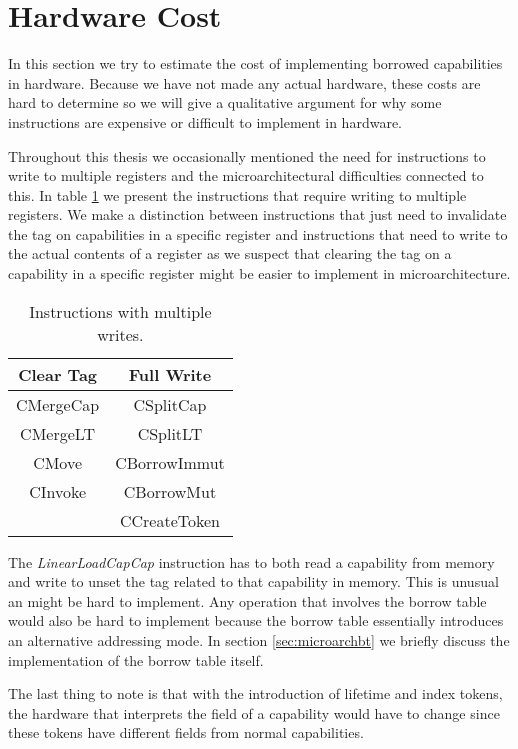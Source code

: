 \section{Hardware Cost}
In this section we try to estimate the cost of implementing borrowed capabilities in hardware.
Because we have not made any actual hardware, these costs are hard to determine so we will give a qualitative argument for why some instructions are expensive or difficult to implement in hardware.

Throughout this thesis we occasionally mentioned the need for instructions to write to multiple registers and the microarchitectural difficulties connected to this.
In table \ref{table:multiplewrites} we present the instructions that require writing to multiple registers.
We make a distinction between instructions that just need to invalidate the tag on capabilities in a specific register and instructions that need to write to the actual contents of a register as we suspect that clearing the tag on a capability in a specific register might be easier to implement in microarchitecture.

\begin{table}[h]
\centering
\begin{tabular}{| c | c |}
\hline
Clear Tag & Full Write \\
\hline
 CMergeCap & CSplitCap \\
 CMergeLT & CSplitLT \\
 CMove & CBorrowImmut \\
 CInvoke & CBorrowMut \\
 & CCreateToken \\
\hline
\end{tabular}
\caption{Instructions with multiple writes.}
\label{table:multiplewrites}
\end{table}

The \textit{LinearLoadCapCap} instruction has to both read a capability from memory and write to unset the tag related to that capability in memory.
This is unusual an might be hard to implement.
Any operation that involves the borrow table would also be hard to implement because the borrow table essentially introduces an alternative addressing mode.
In section \ref{sec:microarchbt} we briefly discuss the implementation of the borrow table itself.

The last thing to note is that with the introduction of lifetime and index tokens, the hardware that interprets the field of a capability would have to change since these tokens have different fields from normal capabilities.

